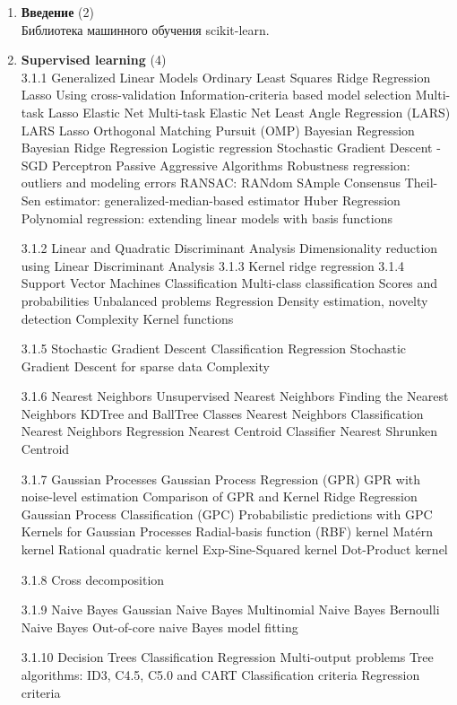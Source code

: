 \documentclass{article}
\begin{document}
\begin{enumerate}
\item \textbf{Введение} (2)\\
Библиотека машинного обучения scikit-learn.

\item \textbf{Supervised learning} (4)\\
3.1.1 Generalized Linear Models
Ordinary Least Squares
Ridge Regression
Lasso
Using cross-validation
Information-criteria based model selection
Multi-task Lasso
Elastic Net
Multi-task Elastic Net
Least Angle Regression (LARS)
LARS Lasso
Orthogonal Matching Pursuit (OMP)
Bayesian Regression
Bayesian Ridge Regression
Logistic regression
Stochastic Gradient Descent - SGD
Perceptron
Passive Aggressive Algorithms
Robustness regression: outliers and modeling errors
RANSAC: RANdom SAmple Consensus
Theil-Sen estimator: generalized-median-based estimator
Huber Regression
Polynomial regression: extending linear models with basis functions

3.1.2 Linear and Quadratic Discriminant Analysis
Dimensionality reduction using Linear Discriminant Analysis
3.1.3 Kernel ridge regression
3.1.4 Support Vector Machines
Classification
Multi-class classification
Scores and probabilities
Unbalanced problems
Regression
Density estimation, novelty detection
Complexity
Kernel functions

3.1.5 Stochastic Gradient Descent
Classification
Regression
Stochastic Gradient Descent for sparse data
Complexity

3.1.6 Nearest Neighbors
Unsupervised Nearest Neighbors
Finding the Nearest Neighbors
KDTree and BallTree Classes
Nearest Neighbors Classification
Nearest Neighbors Regression
Nearest Centroid Classifier
Nearest Shrunken Centroid

3.1.7 Gaussian Processes
Gaussian Process Regression (GPR)
GPR with noise-level estimation
Comparison of GPR and Kernel Ridge Regression
Gaussian Process Classification (GPC)
Probabilistic predictions with GPC
Kernels for Gaussian Processes
Radial-basis function (RBF) kernel
Matérn kernel
Rational quadratic kernel
Exp-Sine-Squared kernel
Dot-Product kernel

3.1.8 Cross decomposition

3.1.9 Naive Bayes
Gaussian Naive Bayes
Multinomial Naive Bayes
Bernoulli Naive Bayes
Out-of-core naive Bayes model fitting

3.1.10 Decision Trees
Classification
Regression
Multi-output problems
Tree algorithms: ID3, C4.5, C5.0 and CART
Classification criteria
Regression criteria


\end{enumerate}
\end{document}
